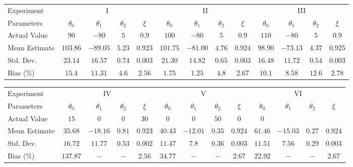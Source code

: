 \documentclass[12pt]{iopart}
\begin{document}

\tiny{\begin{tabular}{lcccccccccccc}
Experiment&\multicolumn{4}{c}{I}&\multicolumn{4}{c}{II}&\multicolumn{4}{c}{III}\\
 Parameters&$\theta_0$&$\theta_1$&$\theta_2$&$\xi$&$\theta_0$&$\theta_1$&$\theta_2$&$\xi$&$\theta_0$&$\theta_1$&$\theta_2$&$\xi$\\
\hline\hline
Actual Value&$90$&$-80$&$5$&$0.9$&$100$&$-80$&$5$&$0.9$&$110$&$-80$&$5$&$0.9$\\
Mean Estimate&$103.86$&$-89.05$&$5.23$&$0.923$&$101.75$&$-81.00$&$4.76$&$0.924$&$98.90 $&$-73.13$&$4.37$&$0.925$\\
Std. Dev.&$23.14$&$16.57$&$0.74$&$0.003$&$21.30$&$14.82$&$0.65$&$0.003$&$16.48$& $11.72$&$0.54$&$0.003$\\
Bias (\%)& $15.4$&$11.31$&$4.6$&$2.56$&$1.75$&$1.25$&$4.8$&$2.67$&$10.1$&$ 8.58$&$12.6$&$2.78$  \\
\end{tabular}}

\tiny{\begin{tabular}{lcccccccccccc}
Experiment&\multicolumn{4}{c}{IV}&\multicolumn{4}{c}{V}&\multicolumn{4}{c}{VI}\\
 Parameters&$\theta_0$&$\theta_1$&$\theta_2$&$\xi$&$\theta_0$&$\theta_1$&$\theta_2$&$\xi$&$\theta_0$&$\theta_1$&$\theta_2$&$\xi$\\
\hline\hline
Actual Value&$15$&$0$&$0$&$30$&$0$&$0$&$50$&$0$&$0$\\
Mean Estimate&$35.68$&$-18.16$&$0.81$&$0.923$&$40.43$&$-12.01$&$ 0.35$&$0.924$&$61.46$&$-15.03$&$0.27$&$0.924$\\
Std. Dev.&$16.72$&$11.77$&$0.53$&$0.002$&$11.47$&$7.8$&$0.36$&$0.003$&$11.51$&$7.56$&$0.29$&$0.003$\\
Bias (\%)&$137.87$&$-$&$-$&$2.56$&$34.77$&$-$&$-$&$2.67$&$22.92$&$-$&$-$&$2.67$\\
\end{tabular}\label{tab:GaussianKernelResults}}
\end{document}
